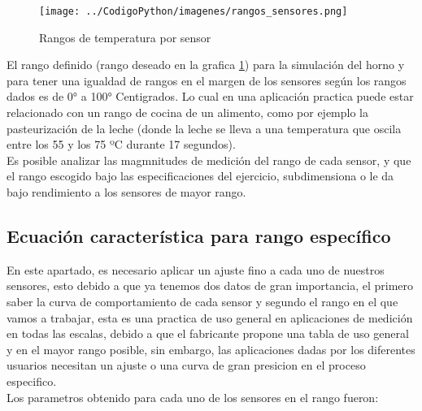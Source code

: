 \documentclass[conference]{IEEEtran}
\begin{document}
\begin{figure}[h!]
	\centering
	\texttt{[image: ../CodigoPython/imagenes/rangos\_sensores.png]}
	\caption{Rangos de temperatura por sensor}
	\label{fig:5}
\end{figure}

El rango definido (rango deseado en la grafica \ref{fig:5}) para la simulación del horno y para tener una igualdad de rangos en el margen de los sensores según los rangos dados es de 0° a 100° Centigrados. Lo cual en una aplicación practica puede estar relacionado con un rango de cocina de un alimento, como por ejemplo la pasteurización de la leche (donde la leche se lleva a una temperatura que oscila entre los 55 y los 75 ºC durante 17 segundos).\\

Es posible analizar las magmnitudes de medición del rango de cada sensor, y que el rango escogido bajo las especificaciones del ejercicio, subdimensiona o le da bajo rendimiento a los sensores de mayor rango.


\subsection{Ecuación caracter\'istica para rango espec\'ifico}

En este apartado, es necesario aplicar un ajuste fino a cada uno de nuestros sensores, esto debido a que ya tenemos dos datos de gran importancia, el primero saber la curva de comportamiento de cada sensor y segundo el rango en el que vamos a trabajar, esta es una practica de uso general en aplicaciones de medición en todas las escalas, debido a que el fabricante propone una tabla de uso general y en el mayor rango posible, sin embargo, las aplicaciones dadas por los diferentes usuarios necesitan un ajuste o una curva de gran presicion en el proceso especifico.\\


Los parametros obtenido para cada uno de los sensores en el rango fueron:
\end{document}
